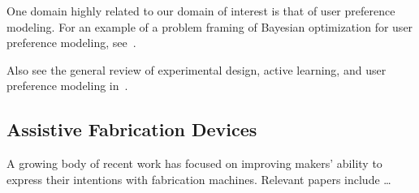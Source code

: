 One domain highly related to our domain of interest is that of user preference modeling.
For an example of a problem framing of Bayesian optimization for user preference modeling, see~\cite{brochu_tutorial_2010}.

Also see the general review of experimental design, active learning, and user preference modeling in~\cite{brochu_tutorial_2010}.

\subsection{Assistive Fabrication Devices}

A growing body of recent work has focused on improving makers' ability to express their intentions with fabrication machines.
Relevant papers include \ldots
